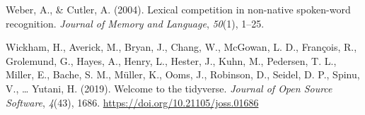 \documentclass[
]{article}
\newlength{\cslhangindent}
\newenvironment{CSLReferences}[2] %
 {\begin{list}{}{%
  \setlength{\itemindent}{0pt}
  \setlength{\leftmargin}{0pt}
  \setlength{\parsep}{0pt}
  \ifodd #1
   \setlength{\leftmargin}{\cslhangindent}
   \setlength{\itemindent}{-1\cslhangindent}
  \fi
  \setlength{\itemsep}{#2\baselineskip}}}
 {\end{list}}
\begin{document}
\begin{CSLReferences}{1}{0}
Weber, A., \& Cutler, A. (2004). Lexical competition in non-native
spoken-word recognition. \emph{Journal of Memory and Language},
\emph{50}(1), 1--25.

Wickham, H., Averick, M., Bryan, J., Chang, W., McGowan, L. D.,
François, R., Grolemund, G., Hayes, A., Henry, L., Hester, J., Kuhn, M.,
Pedersen, T. L., Miller, E., Bache, S. M., Müller, K., Ooms, J.,
Robinson, D., Seidel, D. P., Spinu, V., \ldots{} Yutani, H. (2019).
Welcome to the {tidyverse}. \emph{Journal of Open Source Software},
\emph{4}(43), 1686. \url{https://doi.org/10.21105/joss.01686}

\end{CSLReferences}
\end{document}
